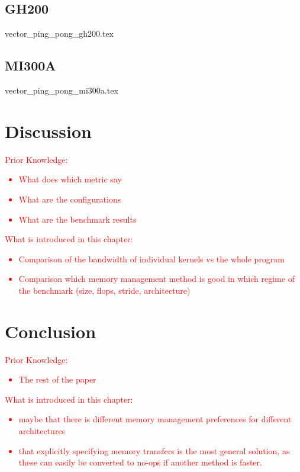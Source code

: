 \documentclass[a4paper,10pt]{scrartcl}
\newcommand\gist[1]{\textcolor{red}{#1}}
\begin{document}
\subsection{GH200}
{vector_ping_pong_gh200.tex}

\subsection{MI300A}
{vector_ping_pong_mi300a.tex}

\section{Discussion}
\gist{
  Prior Knowledge:
\begin{itemize}
\item What does which metric say
\item What are the configurations
\item What are the benchmark results
\end{itemize}
  What is introduced in this chapter:
\begin{itemize}
\item Comparison of the bandwidth of individual kernels vs the whole program
\item Comparison which memory management method is good in which regime of the benchmark (size, flops, stride, architecture)
\end{itemize}
}

\section{Conclusion}
\gist{
  Prior Knowledge:
\begin{itemize}
\item The rest of the paper
\end{itemize}
  What is introduced in this chapter:
\begin{itemize}
\item maybe that there is different memory management preferences for different architectures
\item that explicitly specifying memory transfers is the most general solution, as these can easily be converted to no-ops if another method is faster.
\end{itemize}
}
\end{document}

